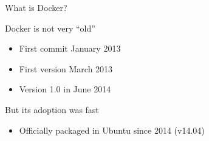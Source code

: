 \begin{frame}{What is Docker?}

Docker is not very “old”
\begin{itemize}
  \item First commit January 2013
  \item First version March 2013
  \item Version 1.0 in June 2014
\end{itemize}

But its adoption was fast
\begin{itemize}
  \item Officially packaged in Ubuntu since 2014 (v14.04) 
\end{itemize}

\end{frame}

